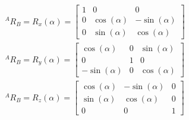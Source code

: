 \begin{subequations}
    \begin{eqnarray}
        ^{A}R_{B} = R_x \left( \alpha \right) = \left[ \begin{array}{ccc} 1 & 0 & 0  \\ 0 & \cos\left(\alpha\right)  & -\sin\left(\alpha\right)  \\ 0 & \sin\left(\alpha\right) & \cos\left(\alpha\right) \end{array} \right] \\
        ^{A}R_{B} = R_y \left( \alpha \right) = \left[ \begin{array}{ccc} \cos\left(\alpha\right) & 0 & \sin\left(\alpha\right)  \\ 0 & 1 & 0  \\ -\sin\left(\alpha\right) & 0 & \cos\left(\alpha\right) \end{array} \right] \\
        ^{A}R_{B} = R_z \left( \alpha \right) = \left[ \begin{array}{ccc} \cos\left(\alpha\right) & -\sin\left(\alpha\right) & 0  \\ \sin\left(\alpha\right) & \cos\left(\alpha\right) & 0  \\ 0 & 0 & 1 \end{array} \right]
    \end{eqnarray}
\end{subequations}

